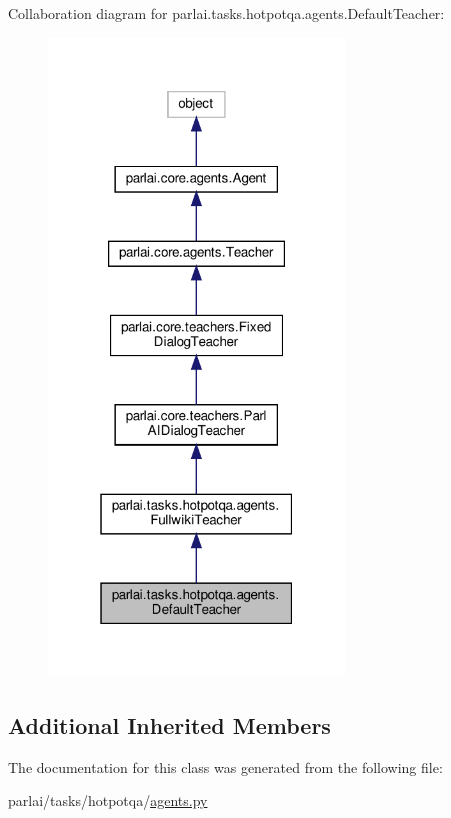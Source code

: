 Collaboration diagram for parlai.\+tasks.\+hotpotqa.\+agents.\+Default\+Teacher\+:
\nopagebreak
\begin{figure}[H]
\begin{center}
\leavevmode
\includegraphics[width=223pt]{classparlai_1_1tasks_1_1hotpotqa_1_1agents_1_1DefaultTeacher__coll__graph}
\end{center}
\end{figure}
\subsection*{Additional Inherited Members}


The documentation for this class was generated from the following file\+:\begin{DoxyCompactItemize}
\item 
parlai/tasks/hotpotqa/\hyperlink{parlai_2tasks_2hotpotqa_2agents_8py}{agents.\+py}\end{DoxyCompactItemize}
